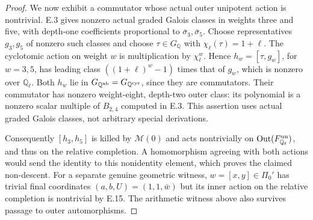 \begin{proof}
We now exhibit a commutator whose actual outer unipotent action is
nontrivial. E.3 gives nonzero actual graded Galois classes in
weights three and five, with depth-one coefficients proportional
to $\bar\sigma_3,\bar\sigma_5$. Choose representatives $g_3,g_5$
of nonzero such classes and choose $\tau\in G_{\mathbb Q}$ with
$\chi_\ell(\tau)=1+\ell$. The cyclotomic action on weight $w$
is multiplication by $\chi_\ell^w$. Hence
$h_w=[\tau,g_w]$, for $w=3,5$, has leading class
$((1+\ell)^w-1)$ times that of $g_w$, which is nonzero over
$\mathbb Q_\ell$. Both $h_w$ lie in
$G_{\mathbb Q^{\rm ab}}=G_{\mathbb Q^{\rm cyc}}$, since they
are commutators. Their commutator has nonzero weight-eight,
depth-two outer class: its polynomial is a nonzero scalar multiple
of $B_{2,4}$ computed in E.3. This assertion uses actual graded
Galois classes, not arbitrary special derivations.

Consequently $[h_3,h_5]$ is killed by $\mathcal M(0)$ and acts
nontrivially on $\operatorname{Out}(F^{\rm un}_{\mathbb Q_\ell})$,
and thus on the relative completion. A homomorphism agreeing with
both actions would send the identity to this nonidentity element,
which proves the claimed non-descent. For a separate genuine
geometric witness, $w=[x,y]\in\Pi_0'$ has trivial final coordinates
$(a,b,U)=(1,1,\bar w)$ but its inner action on the relative
completion is nontrivial by E.15. The arithmetic witness above
also survives passage to outer automorphisms.
\end{proof}

